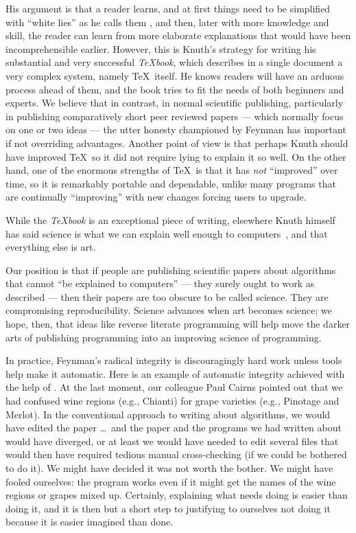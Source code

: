 \documentclass[prodmode,acmtecs]{acmsmall} %
\begin{document}
His argument is that a reader learns, and at first things need to be simplified with ``white lies'' as he calls them \cite[p44]{texbook}, and then, later with more knowledge and skill, the reader can learn from more elaborate explanations that would have been incomprehensible earlier. However, this is Knuth's strategy for writing his substantial and very successful \emph{\TeX book}, which describes in a single document a very complex system, namely \TeX\ itself. He knows readers will have an arduous process ahead of them, and the book tries to fit the needs of both beginners and experts. We believe that in contrast, in normal scientific publishing, particularly in publishing comparatively short peer reviewed papers --- which normally focus on one or two ideas --- the utter honesty championed by Feynman has important if not overriding advantages. Another point of view is that perhaps Knuth should have improved \TeX\ so it did not require lying to explain it so well. On the other hand, one of the enormous strengths of \TeX\ is that it has \emph{not\/} ``improved'' over time, so it is remarkably portable and dependable, unlike many programs that are continually ``improving'' with new changes forcing users to upgrade.

While the \emph{\TeX book} is an exceptional piece of writing, elsewhere Knuth himself has said science is what we can explain well enough to computers~\cite{a=b}, and that everything else is art. 

Our position is that if people are publishing scientific papers about algorithms that cannot ``be explained to computers'' --- they surely ought to work as described --- then their papers are too obscure to be called science. They are compromising reproducibility. Science advances when art becomes science; we hope, then, that ideas like reverse literate programming will help move the darker arts of publishing programming into an improving science of programming.

In practice, Feynman's radical integrity is discouragingly hard work unless tools help make it automatic. Here is an example of automatic integrity achieved with the help of . At the last moment, our colleague Paul Cairns pointed out that we had confused wine regions (e.g., Chianti) for grape varieties (e.g., Pinotage and Merlot). In the conventional approach to writing about algorithms, we would have edited the paper \ldots\ and the paper and the programs we had written about would have diverged, or at least we would have needed to edit several files that would then have required tedious manual cross-checking (if we could be bothered to do it). We might have decided it was not worth the bother. We might have fooled ourselves: the program works even if it might get the names of the wine regions or grapes mixed up. Certainly, explaining what needs doing is easier than doing it, and it is then but a short step to justifying to ourselves not doing it because it is easier imagined than done.
\end{document}

